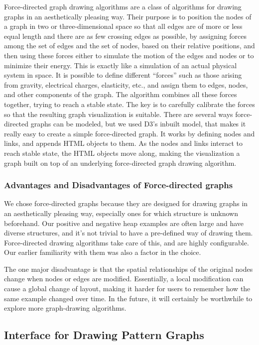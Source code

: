 Force-directed graph drawing algorithms \cite{eades84, fruchterman91} are a class of algorithms for drawing graphs in an aesthetically pleasing way. Their purpose is to position the nodes of a graph in two or three-dimensional space so that all edges are of more or less equal length and there are as few crossing edges as possible, by assigning forces among the set of edges and the set of nodes, based on their relative positions, and then using these forces either to simulate the motion of the edges and nodes or to minimize their energy. This is exactly like a simulation of an actual physical system in space. It is possible to define different ``forces'' such as those arising from gravity, electrical charges, elasticity, etc., and assign them to edges, nodes, and other components of the graph. The algorithm combines all these forces together, trying to reach a stable state. The key is to carefully calibrate the forces so that the resulting graph visualization is suitable. There are several ways force-directed graphs can be modeled, but we used D3's inbuilt model, that makes it really easy to create a simple force-directed graph. It works by defining nodes and links, and appends HTML objects to them. As the nodes and links interact to reach stable state, the HTML objects move along, making the visualization a graph built on top of an underlying force-directed graph drawing algorithm.

\subsubsection{Advantages and Disadvantages of Force-directed graphs}
We chose force-directed graphs because they are designed for drawing graphs in an aesthetically pleasing way, especially ones for which structure is unknown beforehand. Our positive and negative heap examples are often large and have diverse structures, and it's not trivial to have a pre-defined way of drawing them. Force-directed drawing algorithms take care of this, and are highly configurable. Our earlier familiarity with them was also a factor in the choice.

The one major disadvantage is that the spatial relationships of the original nodes change when nodes or edges are modified. Essentially, a local modification can cause a global change of layout, making it harder for users to remember how the same example changed over time. In the future, it will certainly be worthwhile to explore more graph-drawing algorithms.

\subsection{Interface for Drawing Pattern Graphs}

